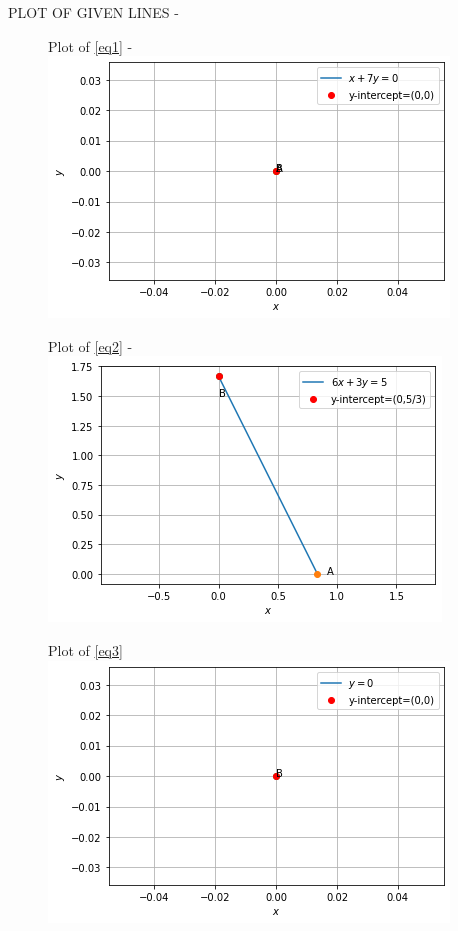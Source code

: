 \documentclass[journal,12pt,twocolumn]{IEEEtran}
\begin{document}
\begin{enumerate}
PLOT OF GIVEN LINES -
\begin{figure}[ht!]
Plot of \eqref{eq1} -
\centering
\includegraphics[width=\columnwidth]{Fig1.png}
\end{figure} 
\begin{figure}[ht!]
Plot of \eqref{eq2} -
\centering
\includegraphics[width=\columnwidth]{Fig2.png}
\end{figure} 
\begin{figure}[ht]
Plot of \eqref{eq3} 
\centering
\includegraphics[width=\columnwidth]{Fig3.png}
\end{figure}    
\end{enumerate}
\end{document}
